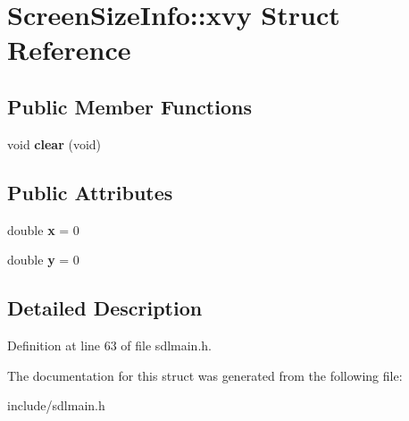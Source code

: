 \hypertarget{structScreenSizeInfo_1_1xvy}{\section{Screen\-Size\-Info\-:\-:xvy Struct Reference}
\label{structScreenSizeInfo_1_1xvy}
}
\subsection*{Public Member Functions}
\begin{DoxyCompactItemize}
\item 
\hypertarget{structScreenSizeInfo_1_1xvy_ad0274a5dd8c0767c8e2786d0bb88eb94}{void {\bfseries clear} (void)}\label{structScreenSizeInfo_1_1xvy_ad0274a5dd8c0767c8e2786d0bb88eb94}

\end{DoxyCompactItemize}
\subsection*{Public Attributes}
\begin{DoxyCompactItemize}
\item 
\hypertarget{structScreenSizeInfo_1_1xvy_aaee511199653156a96af74abeb8d6c0b}{double {\bfseries x} = 0}\label{structScreenSizeInfo_1_1xvy_aaee511199653156a96af74abeb8d6c0b}

\item 
\hypertarget{structScreenSizeInfo_1_1xvy_ac9af3e3b9aec89855687d4484732adbe}{double {\bfseries y} = 0}\label{structScreenSizeInfo_1_1xvy_ac9af3e3b9aec89855687d4484732adbe}

\end{DoxyCompactItemize}


\subsection{Detailed Description}


Definition at line 63 of file sdlmain.\-h.



The documentation for this struct was generated from the following file\-:\begin{DoxyCompactItemize}
\item 
include/sdlmain.\-h\end{DoxyCompactItemize}
